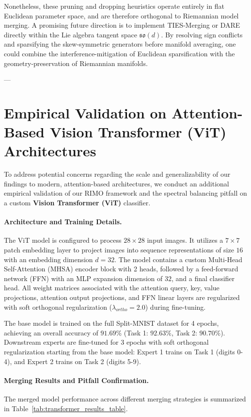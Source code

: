 Nonetheless, these pruning and dropping heuristics operate entirely in flat Euclidean parameter space, and are therefore orthogonal to Riemannian model merging. A promising future direction is to implement TIES-Merging or DARE directly within the Lie algebra tangent space $\mathfrak{so}(d)$. By resolving sign conflicts and sparsifying the skew-symmetric generators before manifold averaging, one could combine the interference-mitigation of Euclidean sparsification with the geometry-preservation of Riemannian manifolds.

---

\section{Empirical Validation on Attention-Based Vision Transformer (ViT) Architectures}
\label{sec:appendix_vit_experiments}

To address potential concerns regarding the scale and generalizability of our findings to modern, attention-based architectures, we conduct an additional empirical validation of our RIMO framework and the spectral balancing pitfall on a custom \textbf{Vision Transformer (ViT)} classifier. 

\paragraph{Architecture and Training Details.}
The ViT model is configured to process $28 \times 28$ input images. It utilizes a $7 \times 7$ patch embedding layer to project images into sequence representations of size $16$ with an embedding dimension $d = 32$. The model contains a custom Multi-Head Self-Attention (MHSA) encoder block with 2 heads, followed by a feed-forward network (FFN) with an MLP expansion dimension of $32$, and a final classifier head. All weight matrices associated with the attention query, key, value projections, attention output projections, and FFN linear layers are regularized with soft orthogonal regularization ($\lambda_{ortho} = 2.0$) during fine-tuning.

The base model is trained on the full Split-MNIST dataset for 4 epochs, achieving an overall accuracy of $91.69\%$ (Task 1: $92.63\%$, Task 2: $90.70\%$). Downstream experts are fine-tuned for 3 epochs with soft orthogonal regularization starting from the base model: Expert 1 trains on Task 1 (digits 0-4), and Expert 2 trains on Task 2 (digits 5-9).

\paragraph{Merging Results and Pitfall Confirmation.}
The merged model performance across different merging strategies is summarized in Table~\ref{tab:transformer_results_table}.

